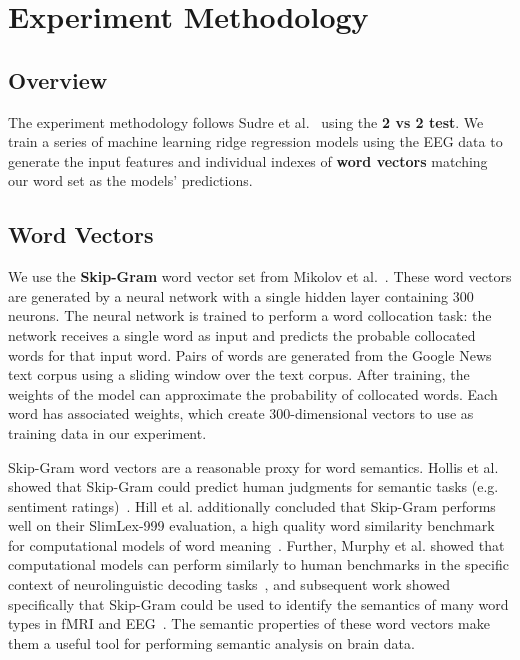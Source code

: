 \section{Experiment Methodology}
\label{sec:methodology}

\subsection{Overview}
The experiment methodology follows Sudre et al.~\cite{Sudre2012} using the {\bf 2 vs 2 test}. We train a series of machine learning ridge regression models using the EEG data to generate the input features and individual indexes of {\bf word vectors} matching our word set as the models' predictions.

\subsection{Word Vectors}
We use the {\bf Skip-Gram} word vector set from Mikolov et al.~\cite{Mikolov2013}. These word vectors are generated by a neural network with a single hidden layer containing 300 neurons. The neural network is trained to perform a word collocation task: the network receives a single word as input and predicts the probable collocated words for that input word. Pairs of words are generated from the Google News text corpus using a sliding window over the text corpus. After training, the weights of the model can approximate the probability of collocated words. Each word has associated weights, which create 300-dimensional vectors to use as training data in our experiment.

 Skip-Gram word vectors are a reasonable proxy for word semantics. Hollis et al. showed that Skip-Gram could predict human judgments for semantic tasks (e.g. sentiment ratings)~\cite{hollis2017extrapolating}. Hill et al. additionally concluded that Skip-Gram performs well on their SlimLex-999 evaluation, a high quality word similarity benchmark for computational models of word meaning~\cite{hill2016simlex}. Further, Murphy et al. showed that computational models can perform similarly to human benchmarks in the specific context of neurolinguistic decoding tasks~\cite{Murphy2012}, and subsequent work showed specifically that Skip-Gram could be used to identify the semantics of many word types in fMRI and EEG~\cite{xu2016brainbench}. The semantic properties of these word vectors make them a useful tool for performing semantic analysis on brain data.

